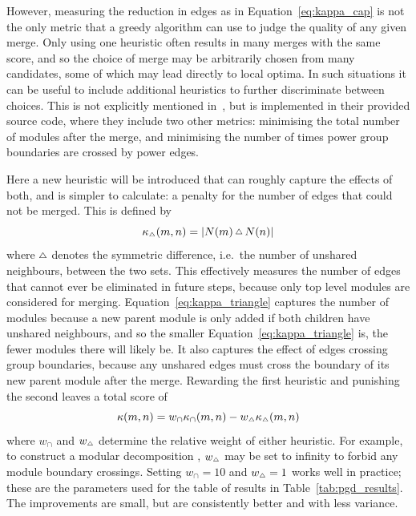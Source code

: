 However, measuring the reduction in edges as in Equation~\eqref{eq:kappa_cap} is not the only metric that a greedy algorithm can use to judge the quality of any given merge.
Only using one heuristic often results in many merges with the same score, and so the choice of merge may be arbitrarily chosen from many candidates, some of which may lead directly to local optima. In such situations it can be useful to include additional heuristics to further discriminate between choices.
This is not explicitly mentioned in~\cite{Dwyer2014}, but is implemented in their provided source code, where they include two other metrics: minimising the total number of modules after the merge, and minimising the number of times power group boundaries are crossed by power edges.

Here a new heuristic will be introduced that can roughly capture the effects of both, and is simpler to calculate: a penalty for the number of edges that could not be merged. This is defined by
\begin{equation}
    \kappa_{\Triangle}(m, n) = |N(m)\,\Triangle\,N(n)|
    \label{eq:kappa_triangle}
\end{equation}
where $\Triangle$ denotes the symmetric difference, i.e.\ the number of unshared neighbours, between the two sets. This effectively measures the number of edges that cannot ever be eliminated in future steps, because only top level modules are considered for merging.
Equation~\eqref{eq:kappa_triangle} captures the number of modules because a new parent module is only added if both children have unshared neighbours, and so the smaller Equation~\eqref{eq:kappa_triangle} is, the fewer modules there will likely be. It also captures the effect of edges crossing group boundaries, because any unshared edges must cross the boundary of its new parent module after the merge.
Rewarding the first heuristic and punishing the second leaves a total score of
\begin{equation}
    \kappa(m,n) =
    w_\cap \kappa_\cap(m,n) -
    w_{\Triangle} \kappa_{\Triangle}(m,n)
    \label{eq:kappa_full}
\end{equation}
where $w_\cap$ and $w_{\Triangle}$ determine the relative weight of either heuristic. For example, to construct a modular decomposition \cite{Habib2004}, $w_{\Triangle}$ may be set to infinity to forbid any module boundary crossings.
Setting $w_\cap=10$ and $w_{\Triangle}=1$ works well in practice; these are the parameters used for the table of results in Table~\ref{tab:pgd_results}.
The improvements are small, but are consistently better and with less variance.
 
